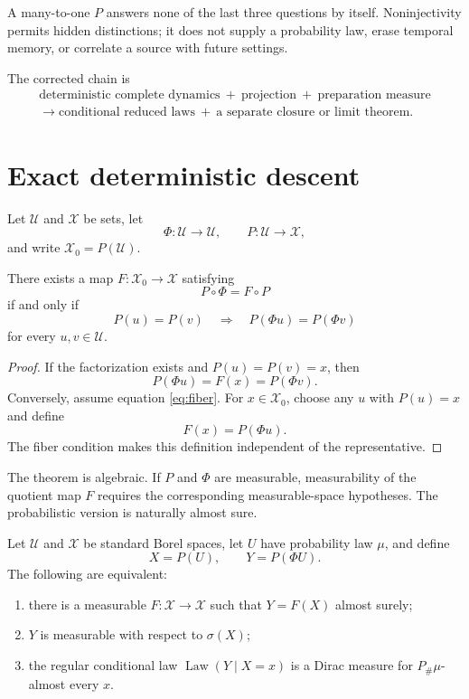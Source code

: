 \documentclass[11pt]{article}
\newcommand{\Uu}{\mathcal U}
\newcommand{\Xx}{\mathcal X}
\newcommand{\Law}{\operatorname{Law}}
\begin{document}
A many-to-one \(P\) answers none of the last three questions by itself.
Noninjectivity permits hidden distinctions; it does not supply a probability
law, erase temporal memory, or correlate a source with future settings.

The corrected chain is
\[
\boxed{
\begin{gathered}
\text{deterministic complete dynamics}
\ +\ \text{projection}
\ +\ \text{preparation measure}\\
\longrightarrow
\text{conditional reduced laws}
\ +\ \text{a separate closure or limit theorem}.
\end{gathered}
}
\]

\section{Exact deterministic descent}

Let \(\Uu\) and \(\Xx\) be sets, let
\[
\Phi:\Uu\to\Uu,
\qquad
P:\Uu\to\Xx,
\]
and write \(\Xx_0=P(\Uu)\).

\begin{theorem}
\label{thm:fiber}
There exists a map \(F:\Xx_0\to\Xx\) satisfying
\[
P\circ\Phi=F\circ P
\]
if and only if
\begin{equation}
P(u)=P(v)
\quad\Longrightarrow\quad
P(\Phi u)=P(\Phi v)
\label{eq:fiber}
\end{equation}
for every \(u,v\in\Uu\).
\end{theorem}

\begin{proof}
If the factorization exists and \(P(u)=P(v)=x\), then
\[
P(\Phi u)=F(x)=P(\Phi v).
\]
Conversely, assume equation \eqref{eq:fiber}. For \(x\in\Xx_0\), choose
any \(u\) with \(P(u)=x\) and define
\[
F(x)=P(\Phi u).
\]
The fiber condition makes this definition independent of the representative.
\end{proof}

The theorem is algebraic. If \(P\) and \(\Phi\) are measurable, measurability
of the quotient map \(F\) requires the corresponding measurable-space
hypotheses. The probabilistic version is naturally almost sure.

\begin{theorem}
\label{thm:as-descent}
Let \(\Uu\) and \(\Xx\) be standard Borel spaces, let \(U\) have probability
law \(\mu\), and define
\[
X=P(U),
\qquad
Y=P(\Phi U).
\]
The following are equivalent:
\begin{enumerate}
\item there is a measurable \(F:\Xx\to\Xx\) such that
\(Y=F(X)\) almost surely;
\item \(Y\) is measurable with respect to \(\sigma(X)\);
\item the regular conditional law \(\Law(Y\mid X=x)\) is a Dirac measure for
\(P_\#\mu\)-almost every \(x\).
\end{enumerate}
\end{theorem}
\end{document}
